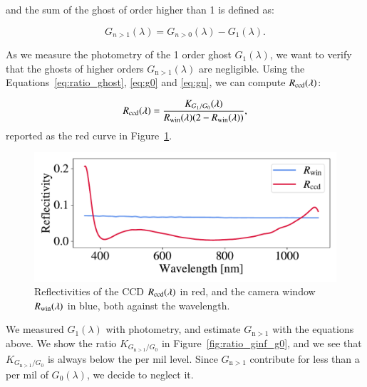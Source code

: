 \noindent and the sum of the ghost of order higher than 1 is defined as:

 \begin{equation}
     G_{n>1}(\lambda) = G_{n>0}(\lambda) - G_1(\lambda).
     \label{eq:sum_ghost_sup_1}
 \end{equation}

\noindent As we measure the photometry of the 1 order ghost $G_1(\lambda)$, we want to verify that the ghosts of higher orders $G_{\mathrm{n}>1}(\lambda)$ are negligible. Using the Equations~\ref{eq:ratio_ghost}, \ref{eq:g0} and \ref{eq:gn}, we can compute $R_{\mathrm{ccd}}(\lambda)$:

\begin{equation}
    R_{\mathrm{ccd}}(\lambda) = \frac{K_{G_1/G_0}(\lambda)}{R_{\mathrm{win}}(\lambda) (2 - R_{\mathrm{win}}(\lambda))},
    \label{eq:rccd}
\end{equation}
reported as the red curve in Figure~\ref{fig:reflectivities}.

\begin{figure}
    \centering
    \includegraphics[width=\columnwidth]{fig/reflectivities.pdf}
    \caption{Reflectivities of the CCD $R_{\mathrm{ccd}}(\lambda)$ in red, and the camera window $R_{\mathrm{win}}(\lambda)$ in blue, both against the wavelength.}
    \label{fig:reflectivities}
\end{figure}


We measured $G_1(\lambda)$ with photometry, and estimate $G_{\mathrm{n}>1}$ with the equations above. We show the ratio $K_{G_{\mathrm{n}>1}/G_0}$ in Figure~\ref{fig:ratio_ginf_g0}, and we see that $K_{G_{\mathrm{n}>1}/G_0}$ is always below the per mil level. Since $G_{\mathrm{n}>1}$ contribute for less than a per mil of $G_0(\lambda)$, we decide to neglect it.

